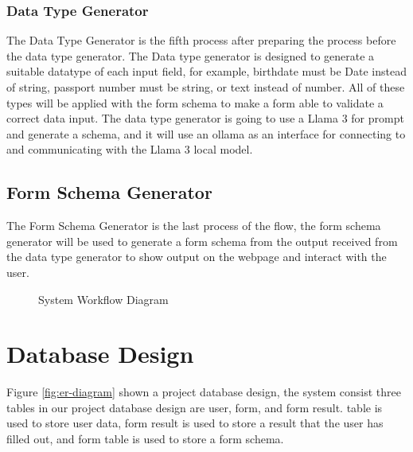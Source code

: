 \documentclass[12pt,oneside,openright,a4paper]{cpe-english-project}
\begin{document}
\subsubsection{Data Type Generator}

The Data Type Generator is the fifth process after preparing the process before the data type generator. The Data type generator is designed to generate a suitable datatype of each input field, for example, birthdate must be Date instead of string, passport number must be string, or text instead of number. All of these types will be applied with the form schema to make a form able to validate a correct data input. The data type generator is going to use a Llama 3 for prompt and generate a schema, and it will use an ollama as an interface for connecting to and communicating with the Llama 3 local model.

\subsection{Form Schema Generator}

The Form Schema Generator is the last process of the flow, the form schema generator will be used to generate a form schema from the output received from the data type generator to show output on the webpage and interact with the user.

\begin{figure}[!h]
\centering
{}
\caption{System Workflow Diagram}\label{fig:system-workflow}
\end{figure}



\section{Database Design}

Figure \ref{fig:er-diagram} shown a project database design, the system consist three tables in our project database design are user, form, and form result. table is used to store user data, form result is used to store a result that the user has filled out, and form table is used to store a form schema.
\end{document}
